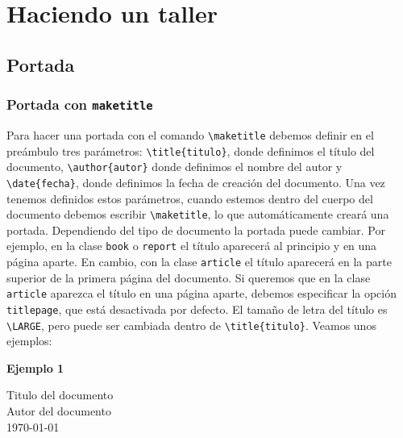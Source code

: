 	\section{Haciendo un taller}
	
	\subsection{Portada}
	
	\subsubsection{Portada con \texttt{maketitle}}
	
	Para hacer una portada con el comando \verb|\maketitle| debemos definir en el preámbulo tres parámetros: \verb|\title{titulo}|, donde definimos el título del documento, \verb|\author{autor}| donde definimos el nombre del autor y \verb|\date{fecha}|, donde definimos la fecha de creación del documento. Una vez tenemos definidos estos parámetros, cuando estemos dentro del cuerpo del documento debemos escribir \verb|\maketitle|, lo que automáticamente creará una portada. Dependiendo del tipo de documento la portada puede cambiar. Por ejemplo, en la clase \texttt{book} o \texttt{report} el título aparecerá al principio y en una página aparte. En cambio, con la clase \texttt{article} el título aparecerá en la parte superior de la primera página del documento. Si queremos que en la clase \texttt{article} aparezca el título en una página aparte, debemos especificar la opción \texttt{titlepage}, que está desactivada por defecto. El tamaño de letra del título es \verb|\LARGE|, pero puede ser cambiada dentro de \verb|\title{titulo}|. Veamos unos ejemplos:
	
	\textbf{Ejemplo 1}
	
	\begin{center}
		\colorbox{light-yellow}{
			\begin{minipage}{\textwidth}
				\centering
				\vspace{50pt}
				{\Huge Titulo del documento}\\
				\vspace{25pt}
				{\large Autor del documento}\\
				\vspace{12.5pt}
				{\large \today}\\
				\vspace{40pt}
			\end{minipage}
		}
	\end{center}

